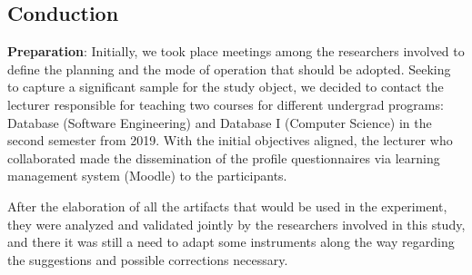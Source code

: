 \documentclass[a4paper,twoside,anonymous]{article}
\begin{document}
\subsection{Conduction}



\textbf{Preparation}: Initially, we took place meetings among the researchers involved to define the planning and the mode of operation that should be adopted.
Seeking to capture a significant sample for the study object, we decided to contact the lecturer responsible for teaching two courses for different undergrad programs: Database (Software Engineering) and Database I (Computer Science) in the second semester from 2019.
With the initial objectives aligned, the lecturer who collaborated made the dissemination of the profile questionnaires via learning management system (Moodle) to the participants.

After the elaboration of all the artifacts that would be used in the experiment, they were analyzed and validated jointly by the researchers involved in this study, and there it was still a need to adapt some instruments along the way regarding the suggestions and possible corrections necessary.

\end{document}
